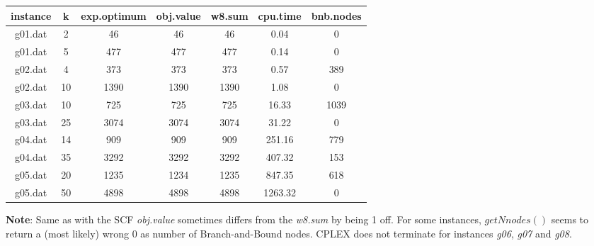 \begin{tabular}{ c | c | c | c | c | c | c }
	instance & k & exp.optimum & obj.value & w8.sum & cpu.time & bnb.nodes \\ 
	\hline
	g01.dat & 2 & 46 & 46 & 46 & 0.04 & 0 \\
	g01.dat & 5 & 477 & 477 & 477 & 0.14 & 0 \\
	g02.dat & 4 & 373 & 373 & 373 & 0.57 & 389 \\
	g02.dat & 10 & 1390 & 1390 & 1390 & 1.08 & 0 \\
	g03.dat & 10 & 725 & 725 & 725 & 16.33 & 1039 \\
	g03.dat & 25 & 3074 & 3074 & 3074 & 31.22 & 0 \\
	g04.dat & 14 & 909 & 909 & 909 & 251.16 & 779 \\
	g04.dat & 35 & 3292 & 3292 & 3292 & 407.32 & 153 \\
	g05.dat & 20 & 1235 & 1234 & 1235 & 847.35 & 618 \\
	g05.dat & 50 & 4898 & 4898 & 4898 & 1263.32 & 0 \\
\end{tabular}

\vspace{0.5cm}

\textbf{Note}: Same as with the SCF \textit{obj.value} sometimes differs from the \textit{w8.sum} by being 1 off. For some instances, $getNnodes()$ seems to return a (most likely) wrong 0 as number of Branch-and-Bound nodes. CPLEX does not terminate for instances \textit{g06}, \textit{g07} and \textit{g08}.

